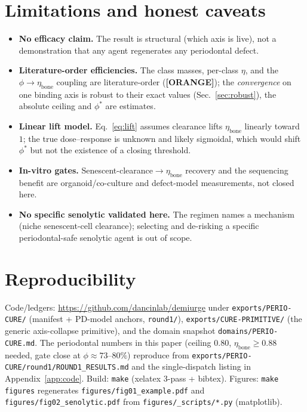 \documentclass[11pt,a4paper]{article}
\newcommand{\tierbadge}[2]{\textcolor{#1}{\textbf{[#2]}}}
\providecommand{\tierOrange}{\tierbadge{orange!80!black}{ORANGE}}
\begin{document}
\section{Limitations and honest caveats}
\label{sec:limits}
\begin{itemize}\itemsep0.2em
\item \textbf{No efficacy claim.} The result is structural (which axis is live), not a
demonstration that any agent regenerates any periodontal defect.
\item \textbf{Literature-order efficiencies.} The class masses, per-class $\eta$, and
the $\phi\to\eta_{\text{bone}}$ coupling are literature-order (\tierOrange); the
\emph{convergence} on one binding axis is robust to their exact values (Sec.~\ref{sec:robust}),
the absolute ceiling and $\phi^\ast$ are estimates.
\item \textbf{Linear lift model.} Eq.~\eqref{eq:lift} assumes clearance lifts
$\eta_{\text{bone}}$ linearly toward $1$; the true dose--response is unknown and likely
sigmoidal, which would shift $\phi^\ast$ but not the existence of a closing threshold.
\item \textbf{In-vitro gates.} Senescent-clearance$\to\eta_{\text{bone}}$ recovery and
the sequencing benefit are organoid/co-culture and defect-model measurements, not
closed here.
\item \textbf{No specific senolytic validated here.} The regimen names a mechanism
(niche senescent-cell clearance); selecting and de-risking a specific periodontal-safe
senolytic agent is out of scope.
\end{itemize}

\section{Reproducibility}
\label{sec:repro}
Code/ledgers: \url{https://github.com/dancinlab/demiurge} under
\texttt{exports/PERIO-CURE/} (manifest + PD-model anchors, \texttt{round1/}),
\texttt{exports/CURE-PRIMITIVE/} (the generic axis-collapse primitive), and the
domain snapshot \texttt{domains/PERIO-CURE.md}. The periodontal numbers in this paper
(ceiling $0.80$, $\eta_{\text{bone}}\geq 0.88$ needed, gate close at $\phi\approx
73$--$80\%$) reproduce from \texttt{exports/PERIO-CURE/round1/ROUND1\_RESULTS.md} and
the single-dispatch listing in Appendix~\ref{app:code}. Build: \texttt{make} (xelatex
3-pass + bibtex). Figures: \texttt{make figures} regenerates
\texttt{figures/fig01\_example.pdf} and \texttt{figures/fig02\_senolytic.pdf} from
\texttt{figures/\_scripts/*.py} (matplotlib).
\end{document}
